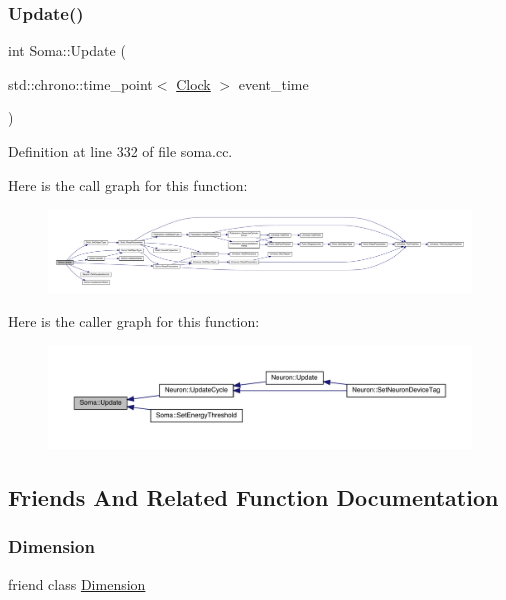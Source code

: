 \subsubsection{\texorpdfstring{Update()}{Update()}}
{\footnotesize\ttfamily int Soma\+::\+Update (\begin{DoxyParamCaption}\item[{std\+::chrono\+::time\+\_\+point$<$ \hyperlink{universe_8h_a0ef8d951d1ca5ab3cfaf7ab4c7a6fd80}{Clock} $>$}]{event\+\_\+time }\end{DoxyParamCaption})}



Definition at line 332 of file soma.\+cc.

Here is the call graph for this function\+:
\nopagebreak
\begin{figure}[H]
\begin{center}
\leavevmode
\includegraphics[width=350pt]{class_soma_a211587ef21a7932c2f8f0345b1d32f57_cgraph}
\end{center}
\end{figure}
Here is the caller graph for this function\+:
\nopagebreak
\begin{figure}[H]
\begin{center}
\leavevmode
\includegraphics[width=350pt]{class_soma_a211587ef21a7932c2f8f0345b1d32f57_icgraph}
\end{center}
\end{figure}


\subsection{Friends And Related Function Documentation}
\mbox{\label{class_soma_aabae1fdc220bf040d4f5c2c057abfcf5}} 
\subsubsection{\texorpdfstring{Dimension}{Dimension}}
{\footnotesize\ttfamily friend class \hyperlink{class_dimension}{Dimension}\hspace{0.3cm}{\ttfamily [friend]}}



